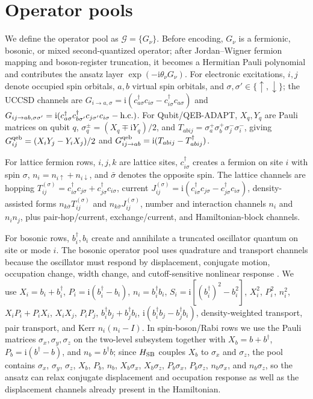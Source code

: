\documentclass[
  reprint,
  amsmath,
  amssymb,
  aps,
  pra,
  nofootinbib,
  superscriptaddress,
  floatfix
]{revtex4-2}
\newcommand{\Gset}{\mathcal{G}}
\newcommand{\ii}{\mathrm{i}}
\begin{document}
\section{Operator pools}
\label{app:pools}

We define the operator pool as \(\Gset=\{G_\nu\}\).  Before encoding,
\(G_\nu\) is a fermionic, bosonic, or mixed second-quantized operator; after
Jordan--Wigner fermion mapping and boson-register truncation, it becomes a
Hermitian Pauli polynomial and contributes the ansatz layer
\(\exp(-\ii\theta_\nu G_\nu)\).  For electronic excitations, \(i,j\) denote
occupied spin orbitals, \(a,b\) virtual spin orbitals, and
\(\sigma,\sigma'\in\{\uparrow,\downarrow\}\); the UCCSD channels are
\(G_{i\to a,\sigma}=\ii(c_{a\sigma}^{\dagger}c_{i\sigma}
-c_{i\sigma}^{\dagger}c_{a\sigma})\) and
\(G_{ij\to ab,\sigma\sigma'}=\ii(c_{a\sigma}^{\dagger}
c_{b\sigma'}^{\dagger}c_{j\sigma'}c_{i\sigma}-{\rm h.c.})\).  For
Qubit/QEB-ADAPT, \(X_q,Y_q\) are Pauli matrices on qubit \(q\),
\(\sigma_q^\pm=(X_q\mp\ii Y_q)/2\), and
\(T_{abij}=\sigma_a^+\sigma_b^+\sigma_j^-\sigma_i^-\), giving
\(G_{ij}^{\rm qeb}=(X_iY_j-Y_iX_j)/2\) and
\(G_{ij\to ab}^{\rm qeb}=\ii(T_{abij}-T_{abij}^{\dagger})\).

For lattice fermion rows, \(i,j,k\) are lattice sites,
\(c_{i\sigma}^{\dagger}\) creates a fermion on site \(i\) with spin
\(\sigma\), \(n_i=n_{i\uparrow}+n_{i\downarrow}\), and \(\bar\sigma\)
denotes the opposite spin.  The lattice channels are hopping
\(T_{ij}^{(\sigma)}=c_{i\sigma}^{\dagger}c_{j\sigma}
+c_{j\sigma}^{\dagger}c_{i\sigma}\), current
\(J_{ij}^{(\sigma)}=\ii(c_{i\sigma}^{\dagger}c_{j\sigma}
-c_{j\sigma}^{\dagger}c_{i\sigma})\), density-assisted forms
\(n_{k\bar\sigma}T_{ij}^{(\sigma)}\) and
\(n_{k\bar\sigma}J_{ij}^{(\sigma)}\), number and interaction channels
\(n_i\) and \(n_in_j\), plus pair-hop/current, exchange/current, and
Hamiltonian-block channels.

For bosonic rows, \(b_i^\dagger,b_i\) create and annihilate a truncated
oscillator quantum on site or mode \(i\).  The bosonic operator pool uses
quadrature and transport channels because the oscillator must respond by
displacement, conjugate motion, occupation change, width change, and
cutoff-sensitive nonlinear response
\cite{Sawaya2020,Li2023,Dutta2024BosonicChemistry,Peng2025BosonHamiltonians}.
We use \(X_i=b_i+b_i^\dagger\), \(P_i=\ii(b_i^\dagger-b_i)\),
\(n_i=b_i^\dagger b_i\), \(S_i=\ii[(b_i^\dagger)^2-b_i^2]\),
\(X_i^2\), \(P_i^2\), \(n_i^2\), \(X_iP_i+P_iX_i\), \(X_iX_j\),
\(P_iP_j\), \(b_i^\dagger b_j+b_j^\dagger b_i\),
\(\ii(b_i^\dagger b_j-b_j^\dagger b_i)\), density-weighted transport,
pair transport, and Kerr \(n_i(n_i-I)\).  In spin-boson/Rabi rows we use
the Pauli matrices \(\sigma_x,\sigma_y,\sigma_z\) on the two-level
subsystem together with \(X_b=b+b^\dagger\), \(P_b=\ii(b^\dagger-b)\),
and \(n_b=b^\dagger b\); since \(H_{\rm SB}\) couples \(X_b\) to
\(\sigma_x\) and \(\sigma_z\), the pool contains \(\sigma_x\),
\(\sigma_y\), \(\sigma_z\), \(X_b\), \(P_b\), \(n_b\),
\(X_b\sigma_x\), \(X_b\sigma_z\), \(P_b\sigma_x\), \(P_b\sigma_z\),
\(n_b\sigma_x\), and \(n_b\sigma_z\), so the ansatz can relax conjugate
displacement and occupation response as well as the displacement channels
already present in the Hamiltonian.
\end{document}
